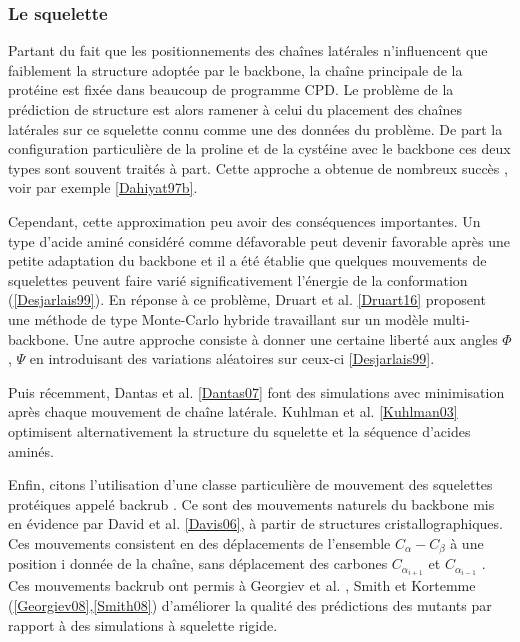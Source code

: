 \subsubsection{Le squelette}
Partant du fait que les positionnements des chaînes latérales n'influencent que faiblement la structure adoptée par le backbone, la chaîne principale de la protéine est fixée dans beaucoup de programme CPD. Le problème de la prédiction de structure est alors ramener à celui du placement des chaînes latérales sur ce squelette connu comme une des données du problème. De part la configuration particulière de la proline et de la cystéine avec le backbone ces deux types sont souvent traités à part. Cette approche a obtenue de nombreux succès , voir par exemple \ref{Dahiyat97b}.

Cependant, cette approximation peu avoir des conséquences importantes. Un type d'acide aminé considéré comme défavorable peut devenir favorable après une petite adaptation du backbone et il a été établie que quelques mouvements de squelettes peuvent faire varié significativement l'énergie de la conformation (\ref{Desjarlais99}).
En réponse à ce problème, Druart et al. \ref{Druart16} proposent une méthode de type Monte-Carlo hybride travaillant sur un modèle multi-backbone. Une autre approche consiste à donner une certaine liberté aux angles $\Phi$ , $\Psi$ en introduisant des variations aléatoires sur ceux-ci \ref{Desjarlais99}.

Puis récemment, Dantas et al. \ref{Dantas07} font des simulations avec minimisation après chaque mouvement de chaîne latérale. Kuhlman et al. \ref{Kuhlman03}  optimisent alternativement la structure du squelette et la séquence d'acides aminés.

Enfin, citons l'utilisation d'une classe particulière de mouvement des squelettes protéiques appelé \og backrub \fg. Ce sont des mouvements naturels du backbone mis en évidence par David et al. \ref{Davis06}, à partir de structures cristallographiques. Ces mouvements consistent en des déplacements de l'ensemble $C_{\alpha}-C_{\beta}$ à une position i donnée de la chaîne, sans déplacement des carbones $C_{\alpha_{i+1}}$ et $C_{\alpha_{i-1}}$ . Ces mouvements backrub ont permis à Georgiev et al. , Smith et Kortemme (\ref{Georgiev08},\ref{Smith08}) d'améliorer la qualité des prédictions des mutants par rapport à des simulations à squelette rigide.

